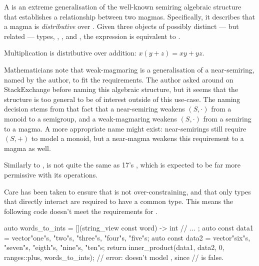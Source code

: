 \begin{itemdescr}
   \pnum
   A  is an extreme generalisation of the well-known semiring algebraic
   structure that establishes a relationship between two magmas. Specifically, it describes that a
   magma  is \textit{distributive} over . Given three objects of possibly
   distinct --- but related --- types, , , and , the expression
    is equivalent to .

   \pnum
   \begin{example}
      Multiplication is distributive over addition: $x(y + z) = xy + yz$.
   \end{example}

   \pnum
   Mathematicians note that weak-magmaring is a generalisation of a near-semiring, named by the
   author, to fit the requirements. The author asked around on StackExchange\cite{stack-exchange-wm}
   before naming this algebraic structure, but it seems that the structure is too general to be of
   interest outside of this use-case. The naming decision stems from that fact that a near-semiring
   weakens $(S, \cdot)$ from a monoid to a semigroup, and a weak-magmaring weakens $(S, \cdot)$ from
   a semiring to a magma. A more appropriate name might exist: near-semirings still require $(S, +)$
   to model a monoid, but a near-magma weakens this requirement to a magma as well.

   \pnum
   Similarly to ,  is not quite the same as
   \Cpp{}17's , which is expected to be far more permissive with its
   operations.
\end{itemdescr}

Care has been taken to ensure that  is not over-constraining, and that only
types that directly interact are required to have a common type. This means the following code
doesn't meet the requirements for .

\begin{codeblock}
auto words_to_ints = [](string_view const word) -> int {
   // ...
};
auto const data1 = vector{"one"s, "two"s, "three"s, "four"s, "five"s};
auto const data2 = vector{"six"s, "seven"s, "eigth"s, "nine"s, "ten"s};
return inner_product(data1, data2, 0, ranges::plus{}, words_to_ints);
// error:  doesn't model , since
//         is false.
\end{codeblock}

